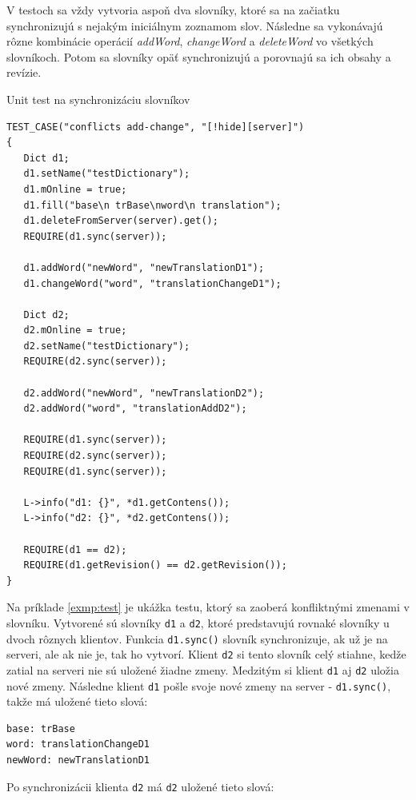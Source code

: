 \documentclass[
  digital, %
  table,   %
  lof,     %
  lot,     %
]{fithesis3}
\begin{document}
V testoch sa vždy vytvoria aspoň dva slovníky, ktoré sa na začiatku synchronizujú s nejakým iniciálnym zoznamom slov. Následne sa vykonávajú rôzne kombinácie operácií \textit{addWord}, \textit{changeWord} a \textit{deleteWord} vo všetkých slovníkoch. Potom sa slovníky opäť synchronizujú a porovnajú sa ich obsahy a revízie.

\begin{exmp}
\label{exmp:test}
Unit test na synchronizáciu slovníkov
\centering
\begin{lstlisting}[basicstyle=\small]
TEST_CASE("conflicts add-change", "[!hide][server]")
{
   Dict d1;
   d1.setName("testDictionary");
   d1.mOnline = true;
   d1.fill("base\n trBase\nword\n translation");
   d1.deleteFromServer(server).get();
   REQUIRE(d1.sync(server));

   d1.addWord("newWord", "newTranslationD1");
   d1.changeWord("word", "translationChangeD1");

   Dict d2;
   d2.mOnline = true;
   d2.setName("testDictionary");
   REQUIRE(d2.sync(server));

   d2.addWord("newWord", "newTranslationD2");
   d2.addWord("word", "translationAddD2");

   REQUIRE(d1.sync(server));
   REQUIRE(d2.sync(server));
   REQUIRE(d1.sync(server));

   L->info("d1: {}", *d1.getContens());
   L->info("d2: {}", *d2.getContens());

   REQUIRE(d1 == d2);
   REQUIRE(d1.getRevision() == d2.getRevision());
}
\end{lstlisting}
\end{exmp}

Na príklade \ref{exmp:test} je ukážka testu, ktorý sa zaoberá konfliktnými zmenami v slovníku. Vytvorené sú slovníky \texttt{d1} a \texttt{d2}, ktoré predstavujú rovnaké slovníky u dvoch rôznych klientov. Funkcia \texttt{d1.sync()} slovník synchronizuje, ak už je na serveri, ale ak nie je, tak ho vytvorí. Klient \texttt{d2} si tento slovník celý stiahne, kedže zatial na serveri nie sú uložené žiadne zmeny. Medzitým si klient \texttt{d1} aj \texttt{d2} uložia nové zmeny. Následne klient \texttt{d1} pošle svoje nové zmeny na server - \texttt{d1.sync()}, takže má uložené tieto slová:
\begin{lstlisting}[basicstyle=\small]
base: trBase
word: translationChangeD1
newWord: newTranslationD1
\end{lstlisting}

Po synchronizácii klienta \texttt{d2} má \texttt{d2} uložené tieto slová:
\end{document}
